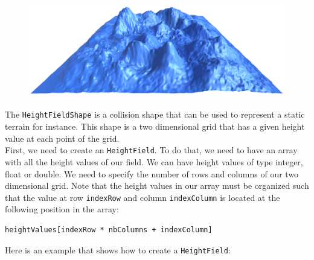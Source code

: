 \documentclass[a4paper,12pt]{article}
\begin{document}
  \begin{figure}[h]
      \centering
      \includegraphics{heightfieldshape.png}
      \label{fig:heightfieldshape}
  \end{figure}

  The \texttt{HeightFieldShape} is a collision shape that can be used to represent a static terrain for instance. This shape is 
  a two dimensional grid that has a given height value at each point of the grid. \\

  First, we need to create an \texttt{HeightField}. To do that, we need to have an array with all the height values of our field.
  We can have height values of type integer, float or double. We need to specify the number of rows and columns of our two
  dimensional grid. Note that the height values in our array must be organized such that the value at row
  \texttt{indexRow} and column \texttt{indexColumn} is located at the following position in the array: \\

  \begin{lstlisting}
heightValues[indexRow * nbColumns + indexColumn]
  \end{lstlisting}

  \vspace{0.6cm}

  Here is an example that shows how to create a \texttt{HeightField}: \\
\end{document}
